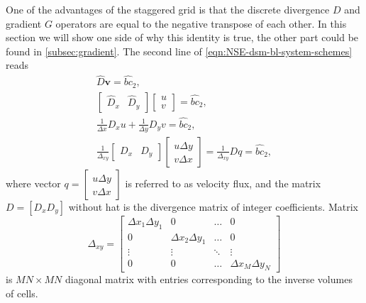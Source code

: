 \documentclass{article}
\numberwithin{equation}{section}
\begin{document}
One of the advantages of the staggered grid is that the discrete divergence $D$ and gradient $G$ operators are equal to the negative transpose of each other. 
In this section we will show one side of why this identity is true, the other part could be found in \cref{subsec:gradient}.
The second line of \cref{eqn:NSE-dsm-bl-system-schemes} reads
\begin{equation*}
\begin{gathered}
\hat{D}\boldsymbol{v}=\hat{bc}_2,\\
\left[ 
\begin{array}{ll}
\hat{D}_x & \hat{D}_y 	
\end{array}
\right]\left[\begin{array}{l}
u\\
v
\end{array}
\right]=\hat{bc}_2
, \\
\frac{1}{\Delta x} D_x u+\frac{1}{\Delta y} D_y v=\hat{bc}_2, \\
\frac{1}{\Delta _{xy}}\left[\begin{array}{ll}
D_x & D_y
\end{array}\right]\left[\begin{array}{l}
u \Delta y \\
v \Delta x
\end{array}\right]=\frac{1}{\Delta _{xy}} D q=\hat{bc}_2,
\end{gathered}
\end{equation*}
where vector $q=\left[\begin{array}{l}
u \Delta y \\
v \Delta x
\end{array}\right]$ is referred to as velocity flux, and the matrix $D=[D_x D_y]$ without hat is the divergence matrix of integer coefficients. Matrix
\begin{equation}\label{eqn:delta-xy}
	\Delta _{xy}=
	\begin{bmatrix}{}
		{\Delta x_1\Delta y_1}		&0	&\dots	&0\\
		0		&{\Delta x_2\Delta y_1}	&\dots	&0\\
		\vdots		&\vdots	&\ddots	&\vdots\\
		0		&0	&\dots	&{\Delta x_M\Delta y_N}
	\end{bmatrix}
\end{equation}
is $MN\times MN$ diagonal matrix with entries corresponding to the inverse volumes of cells. 
\end{document}
